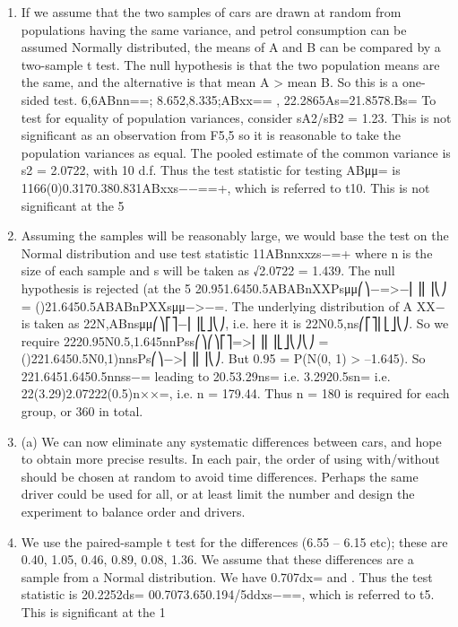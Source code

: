 \documentclass[a4paper,12pt]{article}
\begin{document}
\begin{enumerate}
\item If we assume that the two samples of cars are drawn at random from populations having the same variance, and petrol consumption can be assumed Normally distributed, the means of A and B can be compared by a two-sample t test.
The null hypothesis is that the two population means are the same, and the alternative is that mean A > mean B. So this is a one-sided test.
6,6ABnn==;
8.652,8.335;ABxx==
, 22.2865As=21.8578.Bs=
To test for equality of population variances, consider sA2/sB2 = 1.23. This is not significant as an observation from F5,5 so it is reasonable to take the population variances as equal.
The pooled estimate of the common variance is s2 = 2.0722, with 10 d.f.
Thus the test statistic for testing ABμμ= is
1166(0)0.3170.380.831ABxxs−−==+,
which is referred to t10. This is not significant at the 5%
\item Assuming the samples will be reasonably large, we would base the test on the Normal distribution and use test statistic 11ABnnxxzs−=+ where n is the size of each sample and s will be taken as √2.0722 = 1.439. The null hypothesis is rejected (at the 5%
20.951.6450.5ABABnXXPsμμ⎛⎞−=>−⎜⎟⎜⎟⎝⎠
= ()21.6450.5ABABnPXXsμμ−>−=.
The underlying distribution of A XX− is taken as 22N,ABnsμμ⎛⎞⎡⎤−⎜⎟⎣⎦⎝⎠, i.e. here it is 22N0.5,ns⎛⎡⎤⎜⎣⎦⎝⎠. So we require
2220.95N0.5,1.645nnPss⎛⎞⎛⎞⎡⎤=>⎜⎟⎜⎟⎣⎦⎝⎠⎝⎠ = ()221.6450.5N0,1)nnsPs⎛⎞−>⎜⎟⎜⎟⎝⎠.
But 0.95 = P(N(0, 1) > –1.645).
So 221.6451.6450.5nnss−= leading to
20.53.29ns= i.e. 3.2920.5sn= i.e. 22(3.29)2.07222(0.5)n××=,
i.e. n = 179.44. Thus n = 180 is required for each group, or 360 in total.
\item  (a) We can now eliminate any systematic differences between cars, and hope to obtain more precise results.
In each pair, the order of using with/without should be chosen at random to avoid time differences. Perhaps the same driver could be used for all, or at least limit the number and design the experiment to balance order and drivers.
\item  We use the paired-sample t test for the differences (6.55 – 6.15 etc); these are 0.40, 1.05, 0.46, 0.89, 0.08, 1.36. We assume that these differences are a sample from a Normal distribution.
We have 0.707dx= and . Thus the test statistic is 20.2252ds=
00.7073.650.194/5ddxs−==,
which is referred to t5. This is significant at the 1%
\end{enumerate}
\end{document}
